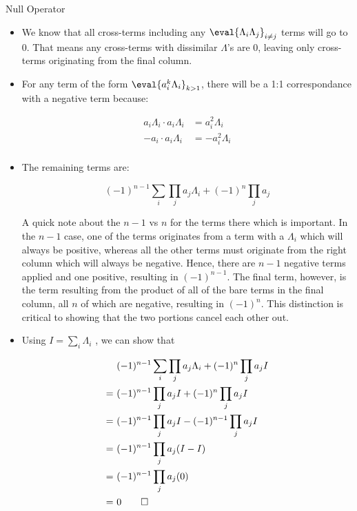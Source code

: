 \begin{answer}
\begin{answerpart}{Null Operator}
\begin{itemize}
  \item We know that all cross-terms including any
    $\eval{\Lambda_i\Lambda_j}_{i \ne j}$ terms will go to 0.
    That means any cross-terms with dissimilar $\Lambda$'s are 0,
    leaving only cross-terms originating from the final column.

  \item For any term of the form $\eval{a_i^k\Lambda_i}_{k>1}$,
    there will be a 1:1 correspondance with a negative term because:

    \begin{equation}
      \begin{split}
        a_i\Lambda_i \cdot a_i\Lambda_i &= a_i^2\Lambda_i\\
        -a_i \cdot a_i\Lambda_i &= -a_i^2\Lambda_i\\
      \end{split}
    \end{equation}

  \item The remaining terms are:

    \begin{equation}
      (-1)^{n-1}\sum_i\prod_ja_j\Lambda_i + (-1)^{n}\prod_ja_j
    \end{equation}

    A quick note about the $n-1$ vs $n$ for the terms there which is
    important.  In the $n-1$ case, one of the terms originates from a
    term with a $\Lambda_i$ which will always be positive, whereas all
    the other terms must originate from the right column which will
    always be negative.  Hence, there are $n-1$ negative terms applied
    and one positive, resulting in $(-1)^{n-1}$.  The final term,
    however, is the term resulting from the product of all of the bare
    terms in the final column, all $n$ of which are negative,
    resulting in $(-1)^n$.  This distinction is critical to showing
    that the two portions cancel each other out.

  \item Using $I = \sum_i\Lambda_i$ , we can show that
    
    \begin{equation}
      \begin{split}
        &(-1)^{n-1}\sum_i\prod_ja_j\Lambda_i + (-1)^{n}\prod_ja_jI\\
        =\ &(-1)^{n-1}\prod_ja_jI + (-1)^{n}\prod_ja_jI\\
        =\ &(-1)^{n-1}\prod_ja_jI - (-1)^{n-1}\prod_ja_jI\\
        =\ &(-1)^{n-1}\prod_ja_j(I - I)\\
        =\ &(-1)^{n-1}\prod_ja_j(0)\\
        =\ &0 \qed\\
      \end{split}
    \end{equation}
  \end{itemize}


\end{answerpart}
\end{answer}
